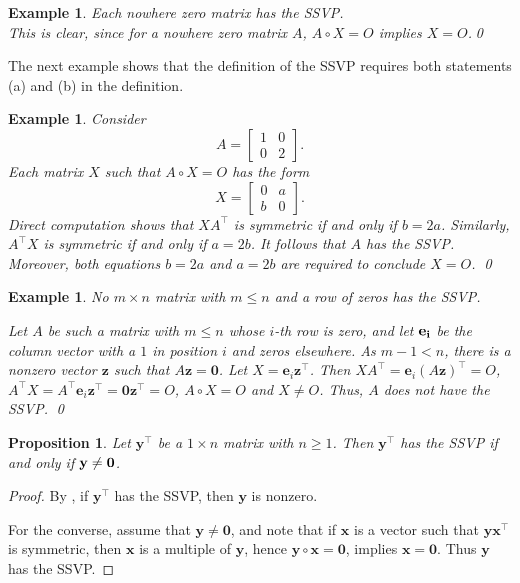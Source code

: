 \documentclass[preprint,12pt]{elsarticle}
\newcommand{\trans  }{^\top}
\newtheorem{proposition}[theorem]{Proposition}
\newtheorem{Example}[theorem]{Example}
\begin{document}
\begin{Example}
\label{nowhere0}
\rm
Each nowhere zero matrix has the SSVP.
\\
This is clear, since for a nowhere zero matrix $A$, $A\circ X=O$ implies $X=O$.\qed 
\end{Example}
The next example shows that the definition of the SSVP requires
both statements (a) and (b) in the definition.
\begin{Example}
\rm 
Consider
\[
A= \left[ \begin{array}{cc} 
1 & 0 \\
0 & 2
\end{array}
\right]. 
\]
Each matrix $X$ such that $A \circ X=O$
has the form 
\[
X=\left[
\begin{array}{ccc}
0 &  a \\
b &  0 
\end{array} 
\right].
\]
Direct computation shows that $XA\trans $ is symmetric 
if and only if $b=2a$. Similarly, $A\trans  X$ is symmetric
if and only if $a=2b$.  It follows that $A$ has the SSVP.
Moreover, both equations $b=2a$ and $a=2b$ are required to conclude
$X=O$.
\qed
\end{Example}

\begin{Example}
\label{zerorow}
\rm
No $m \times n$ matrix with $m\leq n$ and a row of zeros  has the SSVP. 

\bigskip\noindent
Let $A$ be such a matrix with $m\leq n$ whose $i$-th row is zero, and let $\bf e_i$ be the column vector with a $1$ in position $i$ and zeros elsewhere. 
As $m-1<n$, there is a nonzero vector
$\mathbf z$ such that $A{\mathbf z}={\mathbf 0}$.  Let $X= {\mathbf e_i}{\mathbf z}\trans $.  Then $XA\trans = {\mathbf e_i}(A{\mathbf z})\trans =O $, 
$A\trans  X = A\trans  {\mathbf e_i}{\mathbf z}\trans = {\mathbf  0}{\mathbf z}\trans =O$,  $A\circ X=O$ and $
X \neq O$.  Thus, $A$ does not have the SSVP.
\qed 
\end{Example}
\begin{proposition}
Let $\mathbf y\trans$ be a $1 \times n$ matrix with $n\geq 1$.
Then $\mathbf y\trans$ has the SSVP if and only if $\mathbf y\neq {\bf 0}$.
\end{proposition}

\begin{proof}
By , if $\mathbf y\trans$ has the SSVP, then $\mathbf y$ is nonzero.

For the converse, assume that $\mathbf y \neq \mathbf 0$, 
and note that  if $\mathbf x$ is a vector 
such that $\mathbf y \mathbf x\trans$ is symmetric, then $\mathbf x$ is a multiple of $ \mathbf y$, 
hence $\mathbf y\circ \mathbf x=\mathbf 0$, implies $\mathbf x=\mathbf 0$. 
Thus $\mathbf y$ has the SSVP. 
\end{proof}
\end{document}
